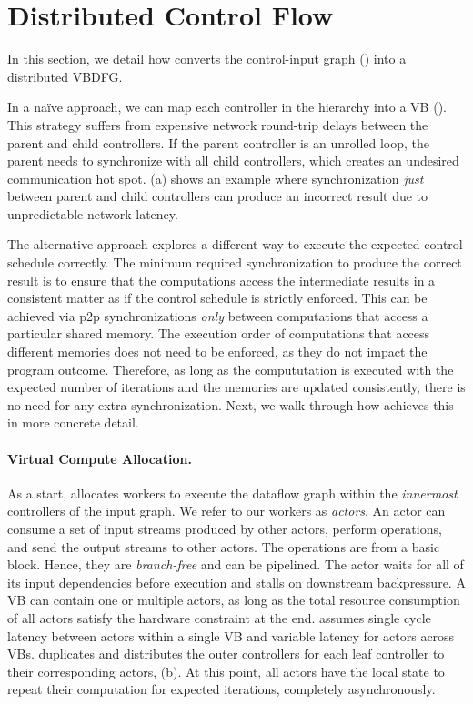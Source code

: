 \section{Distributed Control Flow}
\label{sec:control}

In this section, we detail how \name{} converts the control-input graph () into a distributed VBDFG.

In a na\"ive approach, we can map each controller in the hierarchy into a VB ().
This strategy suffers from expensive network round-trip delays between the parent and child controllers.
If the parent controller is an unrolled loop, the parent needs to synchronize with all child controllers, which creates an undesired communication hot spot.
(a) shows an example where synchronization {\em just} between parent and child controllers can produce an incorrect result due to unpredictable network latency.

The alternative approach explores a different way to execute the expected control schedule correctly. 
The minimum required synchronization to produce the correct result is to ensure that the computations access the intermediate results in a consistent matter as if the control schedule is strictly enforced. 
This can be achieved via p2p synchronizations \emph{only} between computations that access a particular shared memory.
The execution order of computations that access different memories does not need to be enforced, as they do not impact the program outcome.
Therefore, as long as the compututation is executed with the expected number of iterations and the memories are updated consistently, there is no need for any extra synchronization.
Next, we walk through how \name{} achieves this in more concrete detail.

\paragraph{Virtual Compute Allocation.}
As a start, \name{} allocates workers to execute the dataflow graph within the \emph{innermost} controllers of the input graph.
We refer to our workers as {\em actors}. 
An actor can consume a set of input streams produced by other actors, perform operations, and send the output streams to other actors. 
The operations are from a basic block. Hence, they are \emph{branch-free} and can be pipelined.
The actor waits for all of its input dependencies before execution and stalls on downstream backpressure.
A VB can contain one or multiple actors, as long as the total resource consumption of all actors satisfy the hardware constraint at the end.
\name assumes single cycle latency between actors within a single VB and variable latency for actors across VBs.
\name duplicates and distributes the outer controllers for each leaf controller to their corresponding actors, (b).
At this point, all actors have the local state to repeat their computation for expected iterations, completely asynchronously.

